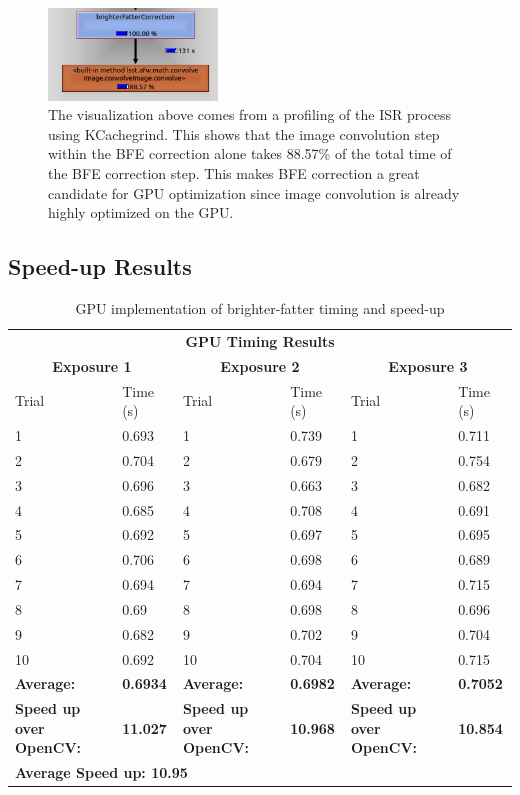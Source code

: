 \documentclass[DM,authoryear,toc]{lsstdoc}
\begin{document}
\begin{figure}[h]
\centering
    \includegraphics[width=0.4\textwidth]{./figs/profling.PNG}
\caption{The visualization above comes from a profiling of the ISR process using KCachegrind. This shows that the image convolution step within the BFE correction alone takes 88.57\% of the total time of the BFE correction step. This makes BFE correction a great candidate for GPU optimization since image convolution is already highly optimized on the GPU.}
\label{fig:kcachegrind}
\end{figure}


\subsection{Speed-up Results}

\begin{table}[h]
\begin{center}
\begin{tabular}{|p{47pt}|p{44pt}|p{45pt}|p{45pt}|p{45pt}|p{45pt}|}
\multicolumn{6}{c}{\textbf{GPU Timing Results}}\\
\multicolumn{2}{c}{\textbf{Exposure 1}} & \multicolumn{2}{c}{\textbf{Exposure 2}} &\multicolumn{2}{c}{\textbf{Exposure 3}}\\ 
\hline
Trial & Time (s) & Trial & Time (s) & Trial & Time (s)\\
\hline
1 & 0.693 & 1 & 0.739 & 1 & 0.711\\
\hline
2 & 0.704 & 2 & 0.679 & 2 & 0.754\\
\hline
3 & 0.696 & 3 & 0.663 & 3 & 0.682\\
\hline
4 & 0.685 & 4 & 0.708 & 4 & 0.691\\
\hline
5 & 0.692 & 5 & 0.697 & 5 & 0.695\\
\hline
6 & 0.706 & 6 & 0.698 & 6 & 0.689\\
\hline
7 & 0.694 & 7 & 0.694 & 7 & 0.715\\
\hline
8 & 0.69 & 8 & 0.698 & 8 & 0.696\\
\hline
9 & 0.682 & 9 & 0.702 & 9 & 0.704\\
\hline
10 & 0.692 & 10 & 0.704 & 10 & 0.715\\
\hline
\textbf{Average:} & \textbf{0.6934} & \textbf{Average:} & \textbf{0.6982} & \textbf{Average:} & \textbf{0.7052}\\
\hline
\textbf{Speed up over OpenCV:} & \textbf{11.027} & \textbf{Speed up over OpenCV:} & \textbf{10.968} & \textbf{Speed up over OpenCV:} & \textbf{10.854}\\
\hline
\multicolumn{3}{l}{\textbf{Average Speed up: 10.95}}&\multicolumn{3}{c}{}\\
\end{tabular}
\caption{\label{tab:gputimes}GPU implementation of brighter-fatter timing and speed-up}
\end{center}
\end{table}
\end{document}
